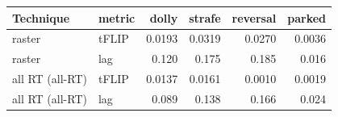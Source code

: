 \begin{tabular}{llrrrr}
\toprule
Technique & metric & dolly & strafe & reversal & parked \\
\midrule
raster & tFLIP & 0.0193 & 0.0319 & 0.0270 & 0.0036 \\
raster & lag & 0.120 & 0.175 & 0.185 & 0.016 \\
all RT (all-RT) & tFLIP & 0.0137 & 0.0161 & 0.0010 & 0.0019 \\
all RT (all-RT) & lag & 0.089 & 0.138 & 0.166 & 0.024 \\
\bottomrule
\end{tabular}

